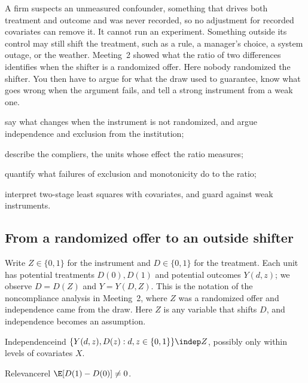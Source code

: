 \documentclass[11pt]{article}
\begin{document}

\begin{decision}
A firm suspects an unmeasured confounder, something that drives both treatment and outcome and was never recorded, so no
adjustment for recorded covariates can remove it. It cannot run an experiment. Something outside its control may still shift
the treatment, such as a rule, a manager's choice, a system outage, or the weather. Meeting~2 showed what the ratio of two
differences identifies when the shifter is a randomized offer. Here nobody randomized the shifter. You then have to argue
for what the draw used to guarantee, know what goes wrong when the argument fails, and tell a strong instrument from a weak one.
\end{decision}

\begin{goals}
  \item say what changes when the instrument is not randomized, and argue independence and exclusion from the institution;
  \item describe the compliers, the units whose effect the ratio measures;
  \item quantify what failures of exclusion and monotonicity do to the ratio;
  \item interpret two-stage least squares with covariates, and guard against weak instruments.
\end{goals}

\sectionone

\subsection{From a randomized offer to an outside shifter}

Write $Z \in \{0,1\}$ for the instrument and $D \in \{0,1\}$ for the treatment. Each unit has potential treatments
$D(0), D(1)$ and potential outcomes $Y(d, z)$; we observe $D = D(Z)$ and $Y = Y(D, Z)$. This is the notation of the
noncompliance analysis in Meeting~2, where $Z$ was a randomized offer and independence came from the draw. Here $Z$ is any
variable that shifts $D$, and independence becomes an assumption.

\begin{assum}{Independence}{ind}
$\{Y(d,z), D(z) : d, z \in \{0,1\}\} \indep Z$, possibly only within levels of covariates $X$.
\end{assum}
\begin{assum}{Relevance}{rel}
$\E[D(1) - D(0)] \ne 0$.
\end{assum}
\end{document}
